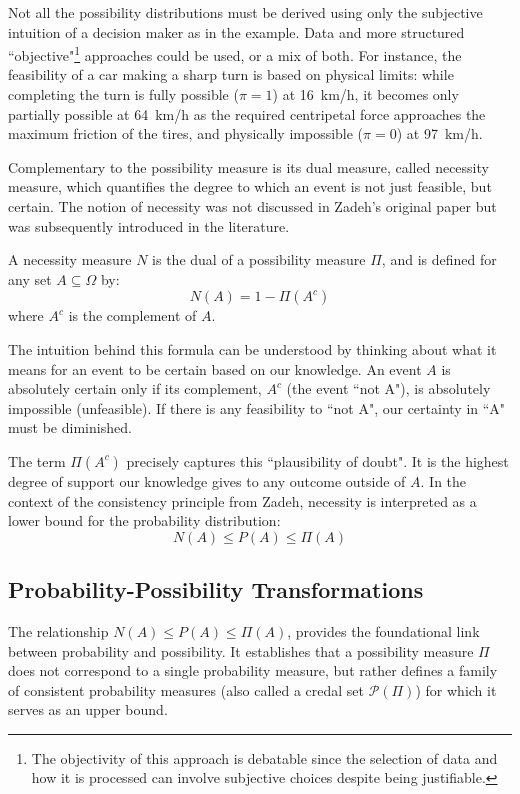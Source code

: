 \begin{remark}
    Not all the possibility distributions must be derived using only the subjective intuition of a decision maker as in the example. Data and more structured ``objective"\footnote{The objectivity of this approach is debatable since the selection of data and how it is processed can involve subjective choices despite being justifiable.} approaches could be used, or a mix of both. 
    For instance, the feasibility of a car making a sharp turn is based on physical limits: while completing the turn is fully possible ($\pi=1$) at 16~km/h, it becomes only partially possible at 64~km/h as the required centripetal force approaches the maximum friction of the tires, and physically impossible ($\pi=0$) at 97~km/h.
\end{remark}

Complementary to the possibility measure is its dual measure, called necessity measure, which quantifies the degree to which an event is not just feasible, but certain. The notion of necessity was not discussed in Zadeh's original paper but was subsequently introduced in the literature.

\begin{definition}
A necessity measure $N$ is the dual of a possibility measure $\Pi$, and is defined for any set $A \subseteq \Omega$ by:
\[ N(A) = 1 - \Pi(A^c) \]
where $A^c$ is the complement of $A$.
\end{definition}

The intuition behind this formula can be understood by thinking about what it means for an event to be certain based on our knowledge. An event $A$ is absolutely certain only if its complement, $A^c$ (the event ``not A"), is absolutely impossible (unfeasible). If there is any feasibility to ``not A", our certainty in ``A" must be diminished.

The term $\Pi(A^c)$ precisely captures this ``plausibility of doubt". It is the highest degree of support our knowledge gives to any outcome outside of $A$. In the context of the consistency principle from Zadeh, necessity is interpreted as a lower bound for the probability distribution:
\[N(A) \le P(A) \le \Pi(A)\]

\subsection{Probability-Possibility Transformations}



The relationship $N(A) \le P(A) \le \Pi(A)$, provides the foundational link between probability and possibility. It establishes that a possibility measure $\Pi$ does not correspond to a single probability measure, but rather defines a family of consistent probability measures (also called a credal set $\mathcal{P}(\Pi)$) for which it serves as an upper bound.

